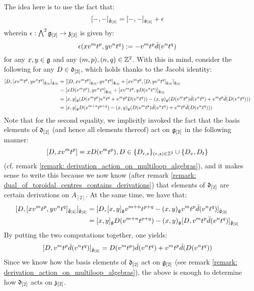 \begin{remark}
                The idea here is to use the fact that:
                    $$[-, -]_{\tilde{\mathfrak{g}}_{[2]}} = [-, -]_{\mathfrak{g}_{[2]}} + \epsilon$$
                wherein $\epsilon: \bigwedge^2 \mathfrak{g}_{[2]} \to \mathfrak{z}_{[2]}$ is given by:
                    $$\epsilon(x v^m t^p, y v^n t^q) := -v^m t^p \bar{d}(v^n t^q)$$
                for any $x, y \in \mathfrak{g}$ and any $(m, p), (n, q) \in \mathbb{Z}^2$. With this in mind, consider the following for any $D \in \mathfrak{d}_{[2]}$, which holds thanks to the Jacobi identity:
                    $$
                        \begin{aligned}
                            [ D, [x v^m t^p, y v^n t^q]_{\tilde{\g}_{[2]}} ]_{\hat{\g}_{[2]}} & = [ [D, x v^m t^p]_{\hat{\g}_{[2]}}, y v^n t^q ]_{\tilde{\g}_{[2]}} + [ x v^m t^p, [D, y v^n t^q]_{\hat{\g}_{[2]}} ]_{\tilde{\g}_{[2]}}
                            \\
                            & = [x D(v^m t^p), y v^n t^q]_{\hat{\g}_{[2]}} + [x v^m t^p, y D(v^n t^q)]_{\hat{\g}_{[2]}}
                            \\
                            & = [x, y]_{\g} (D(v^m t^p) v^n t^q + v^m t^p D(v^n t^q)) - (x, y)_{\g} ( D(v^m t^p) \bar{d}(v^n t^q) + v^m t^p \bar{d}(D(v^n t^q)) )
                            \\
                            & = [x, y]_{\g} D(v^{m + n} t^{p + q}) - (x, y)_{\g} ( D(v^m t^p) \bar{d}(v^n t^q) + v^m t^p \bar{d}(D(v^n t^q)) )
                        \end{aligned}
                    $$
                Note that for the second equality, we implicitly invoked the fact that the basis elements of $\mathfrak{d}_{[2]}$ (and hence all elements thereof) act on $\mathfrak{g}_{[2]}$ in the following manner:
                    $$[D, x v^m t^p] = x D(v^m t^p), D \in \{D_{r, s}\}_{(r, s) \in \mathbb{Z}^2} \cup \{D_v, D_t\}$$
                (cf. remark \ref{remark: derivation_action_on_multiloop_algebras}), and it makes sense to write this because we now know (after remark \ref{remark: dual_of_toroidal_centres_contains_derivations}) that elements of $\mathfrak{d}_{[2]}$ are certain derivations on $A_{[2]}$. At the same time, we have that:
                    $$
                        \begin{aligned}
                            [ D, [x v^m t^p, y v^n t^q]_{\tilde{\g}_{[2]}} ]_{\hat{\g}_{[2]}} & = [ D, [x, y]_{\g} v^{m + n} t^{p + q} - (x, y)_{\g} v^m t^p \bar{d}(v^n t^q) ]_{\hat{\g}_{[2]}}
                            \\
                            & = [x, y]_{\g} D(v^{m + n} t^{p + q}) - (x, y)_{\g} [D, v^m t^p \bar{d}(v^n t^q)]_{\hat{\g}_{[2]}}
                        \end{aligned}
                    $$
                By putting the two computations together, one yields:
                    $$[D, v^m t^p \bar{d}(v^n t^q)]_{\hat{\mathfrak{g}}_{[2]}} = D(v^m t^p) \bar{d}(v^n t^q) + v^m t^p \bar{d}(D(v^n t^q))$$
                Since we know how the basis elements of $\mathfrak{d}_{[2]}$ act on $\mathfrak{g}_{[2]}$ (see remark \ref{remark: derivation_action_on_multiloop_algebras}), the above is enough to determine how $\mathfrak{d}_{[2]}$ acts on $\mathfrak{z}_{[2]}$. 


\end{remark}
